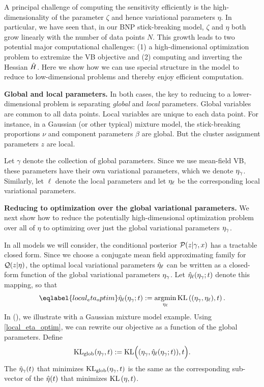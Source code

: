 A principal challenge of computing the sensitivity efficiently is
the high-dimensionality of the parameter $\zeta$ and hence variational
parameters $\eta$. In particular, we have seen that, in our BNP stick-breaking model,
$\zeta$ and $\eta$ both
grow linearly with the number of data points $N$.
This growth leads to two potential major computational challenges: (1) a high-dimensional optimization
problem to extremize the VB objective and (2) computing and inverting the Hessian $\hat{H}$.
Here we show how we can use special structure in the model to reduce to low-dimensional problems
and thereby enjoy efficient computation.

\noindent \textbf{Global and local parameters.}
In both cases, the key to reducing to a lower-dimensional problem is separating
\emph{global} and \emph{local} parameters. Global variables are common to all data points.
Local variables are unique to each data point. For instance, in a Gaussian (or other typical) mixture model,
the stick-breaking proportions $\nu$ and component parameters $\beta$ are global. But the
cluster assignment parameters $z$ are local.

Let $\gamma$ denote the collection of global parameters. Since we use mean-field VB,
these parameters have their own variational parameters, which we denote $\eta_{\gamma}$.
Similarly, let $\ell$ denote the local parameters and let $\eta_{\ell}$ be the corresponding local variational parameters.

\noindent \textbf{Reducing to optimization over the global variational parameters.}
We next show how to reduce the potentially high-dimensional optimization problem over all of
$\eta$ to optimizing over just the global variational parameters $\eta_{\gamma}$.

In all models we will consider, the conditional posterior $\mathcal{P}(z \vert
\gamma,x)$ has a tractable closed form.  Since we choose a conjugate mean field
approximating family for $\mathcal{Q}(z \vert \eta)$, the optimal
local variational parameters $\hat\eta_{\ell}$ can be written as a closed-form
function of the global variational parameters $\eta_{\gamma}$. Let
$\hat\eta_{\ell}(\eta_\gamma; t)$ denote this mapping, so that
%
\begin{align}\eqlabel{local_eta_optim}
\etaoptlocal(\etaglob; \t) :=
    \argmin_{\etalocal} \KL{(\eta_\gamma, \etalocal), \t}.
\end{align}
%
In  (), we illustrate with a Gaussian mixture model example.
%
Using \eqref{local_eta_optim}, we can rewrite our objective as a
function of the global parameters.  Define
%
\begin{align*}
\KLglobal(\etaglob, \t) :=
    \mathrm{KL}\Big((\etaglob, \etaoptlocal(\etaglob; \t)), \t\Big).
\end{align*}
%
The $\hat\eta_{\gamma}(t)$ that minimizes $\mathrm{KL}_{\mathrm{glob}}(\eta_{\gamma}, t)$ is the same as
the corresponding sub-vector of the $\hat\eta(t)$ that minimizes $\mathrm{KL}\left(\eta,
t\right)$.  %

